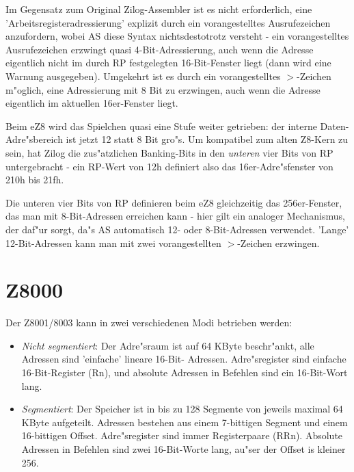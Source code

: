 \documentclass[12pt,a4paper,twoside]{report}
\newcommand{\asname}{AS}
\begin{document}
Im Gegensatz zum Original Zilog-Assembler ist es nicht erforderlich,
eine 'Arbeitsregisteradressierung' explizit durch ein vorangestelltes
Ausrufezeichen anzufordern, wobei \asname{} diese Syntax nichtsdestotrotz
versteht - ein vorangestelltes Ausrufezeichen erzwingt quasi
4-Bit-Adressierung, auch wenn die Adresse eigentlich nicht im durch
RP festgelegten 16-Bit-Fenster liegt (dann wird eine Warnung
ausgegeben).  Umgekehrt ist es durch ein vorangestelltes $>$-Zeichen
m"oglich, eine Adressierung mit 8 Bit zu erzwingen, auch wenn die
Adresse eigentlich im aktuellen 16er-Fenster liegt.

Beim eZ8 wird das Spielchen quasi eine Stufe weiter getrieben: der
interne Daten-Adre"sbereich ist jetzt 12 statt 8 Bit gro"s.  Um
kompatibel zum alten Z8-Kern zu sein, hat Zilog die zus"atzlichen
Banking-Bits in den {\em unteren} vier Bits von RP untergebracht -
ein RP-Wert von 12h definiert also das 16er-Adre"sfenster von 210h
bis 21fh.

Die unteren vier Bits von RP definieren beim eZ8 gleichzeitig das
256er-Fenster, das man mit 8-Bit-Adressen erreichen kann - hier gilt
ein analoger Mechanismus, der daf"ur sorgt, da"s \asname{} automatisch 12-
oder 8-Bit-Adressen verwendet.  'Lange' 12-Bit-Adressen kann man mit
zwei vorangestellten $>$-Zeichen erzwingen.


\section{Z8000}
\label{Z8000Spec}

Der Z8001/8003 kann in zwei verschiedenen Modi betrieben werden:
\begin{itemize}
\item{{\em Nicht segmentiert}: Der Adre"sraum ist auf 64 KByte
      beschr"ankt, alle Adressen sind 'einfache' lineare 16-Bit-
      Adressen.  Adre"sregister sind einfache 16-Bit-Register (Rn),
      und absolute Adressen in Befehlen sind ein 16-Bit-Wort lang.}
\item{{\em Segmentiert}: Der Speicher ist in bis zu 128 Segmente von
      jeweils maximal 64 KByte aufgeteilt.  Adressen bestehen aus
      einem 7-bittigen Segment und einem 16-bittigen Offset.  Adre"sregister
      sind immer Registerpaare (RRn).  Absolute Adressen in Befehlen
      sind zwei 16-Bit-Worte lang, au"ser der Offset is kleiner 256.}
\end{itemize}
\end{document}
